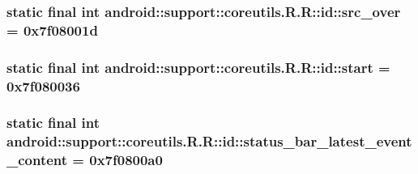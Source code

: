 \hypertarget{classandroid_1_1support_1_1coreutils_1_1_r_1_1id_893a5cbeff9a63eedb50e2d9d1d88326}{
\subsubsection[{src\_\-over}]{\setlength{\rightskip}{0pt plus 5cm}static final int android::support::coreutils.R.R::id::src\_\-over = 0x7f08001d}}
\label{classandroid_1_1support_1_1coreutils_1_1_r_1_1id_893a5cbeff9a63eedb50e2d9d1d88326}


\hypertarget{classandroid_1_1support_1_1coreutils_1_1_r_1_1id_56cd9941901072fb29876376433fc46a}{
\subsubsection[{start}]{\setlength{\rightskip}{0pt plus 5cm}static final int android::support::coreutils.R.R::id::start = 0x7f080036}}
\label{classandroid_1_1support_1_1coreutils_1_1_r_1_1id_56cd9941901072fb29876376433fc46a}


\hypertarget{classandroid_1_1support_1_1coreutils_1_1_r_1_1id_cbdf86cc7b50e66a46fbf4bd5a690447}{
\subsubsection[{status\_\-bar\_\-latest\_\-event\_\-content}]{\setlength{\rightskip}{0pt plus 5cm}static final int android::support::coreutils.R.R::id::status\_\-bar\_\-latest\_\-event\_\-content = 0x7f0800a0}}
\label{classandroid_1_1support_1_1coreutils_1_1_r_1_1id_cbdf86cc7b50e66a46fbf4bd5a690447}


